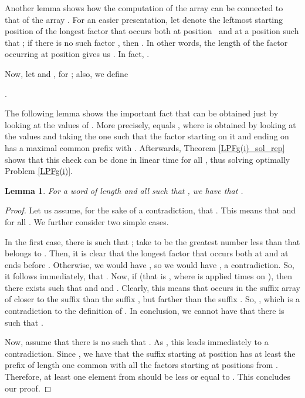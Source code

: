 \documentclass[final]{dmtcs-episciences}
\newtheorem{lemma}{Lemma}
\begin{document}
Another lemma shows how the computation of the array  can be connected to that of the array . For an easier presentation, let  denote the leftmost starting position of the longest factor  that occurs both at position~ and at a position  such that ; if there is no such factor , then . In other words, the length of the factor  occurring at position  gives us . In fact, . 

Now, let  and , for ; also, we define \\
\centerline{.} 

The following lemma shows the important fact that  can be obtained just by looking at the values of . More precisely,  equals , where  is obtained by looking at the values  and taking the one such that the factor starting on it and ending on  has a maximal common prefix with . Afterwards, Theorem \ref{LPFg(i)_sol_rep} shows that this check can be done in linear time for all , thus solving optimally Problem \ref{LPFg(i)}. 

\begin{lemma}\label{iterated_L}
For a word  of length  and all  such that , we have that . 
\end{lemma}
\begin{proof}
Let us assume, for the sake of a contradiction, that . This means that  and  for all . We further consider two simple cases.

In the first case, there is  such that ; take  to be the greatest number less than  that belongs to . Then, it is clear that the longest factor that occurs both at  and at  ends before . Otherwise, we would have , so we would have , a contradiction. So, it follows immediately, that . Now, if  (that is , where  is applied  times on ), then there exists  such that  and  and . Clearly, this means that  occurs in the suffix array of  closer to the suffix  than the suffix , but farther than the suffix . So, , which is a contradiction to the definition of . In conclusion, we cannot have that there is  such that .

Now, assume that there is no  such that . As , this leads immediately to a contradiction. Since , we have that the suffix starting at position  has at least the prefix of length one common with all the factors starting at positions from . Therefore, at least one element from  should be less or equal to . 
This concludes our proof.
\end{proof}
\end{document}
